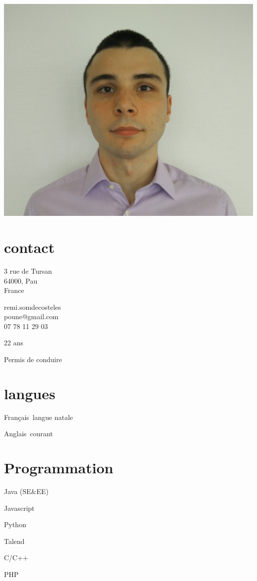 \begin{aside}
%
\includegraphics[width=1\textwidth]{photo.jpg}
\section{contact}
    \item{
        3 rue de Tursan\\
        64000, Pau\\
        France
    }
    \item{
        remi.somdecosteles\\poune@gmail.com\\
        07 78 11 29 03
    }
    \item 22 ans
    \item Permis de conduire

\section{langues}
    \item Français\cdotp~langue natale
    \item Anglais\cdotp~courant

\section{Programmation}
    \item Java (SE\&EE)
    \item Javascript
    \item Python
    \item Talend
    \item C/C++
    \item PHP
\end{aside}
